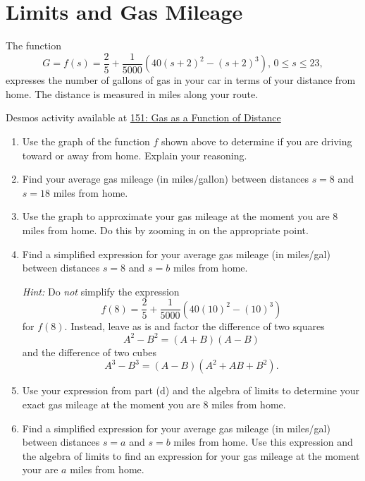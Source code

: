 \documentclass{ximera}
\begin{document}
\section{Limits and Gas Mileage}
\begin{example} \label{Ex:9sd8gfs}
The function 
\[
   G = f(s) = \frac{2}{5} +\frac{1}{5000}(40(s+2)^2 - (s+2)^3) , \, 0\leq s \leq 23 ,
\]
expresses the number of gallons of gas in your car in terms of your distance from home. The distance is measured in miles along your route. 

\begin{onlineOnly}
    \begin{center}
\end{center}
\end{onlineOnly}

Desmos activity available at
\href{https://www.desmos.com/calculator/xzkknfpkw3}{151: Gas as a Function of Distance}

\begin{enumerate}
\item Use the graph of the function $f$ shown above to determine if you are driving toward or away from home. Explain your reasoning.

\item Find your average gas mileage (in miles/gallon) between distances $s=8$ and $s=18$ miles from home.

\item Use the graph to approximate your gas mileage at the moment you are $8$ miles from home. Do this by zooming in on the appropriate point.

\item Find a simplified expression for your average gas mileage (in miles/gal) between distances $s=8$ and $s=b$ miles from home. 

\emph{Hint:} Do \emph{not} simplify the expression 
\[
     f(8) = \frac{2}{5} +\frac{1}{5000}(40(10)^2 - (10)^3)
\]
for $f(8)$. Instead, leave as is and factor the difference of two squares 
\[
     A^2 - B^2 = (A+B)(A-B)
\]
and the difference of two cubes
\[
       A^3 - B^3 = (A-B)(A^2 + AB + B^2).
\]

\item Use your expression from part (d) and the algebra of limits to determine your exact gas mileage at the moment you are $8$ miles from home.

\item Find a simplified expression for your average gas mileage (in miles/gal) between distances $s=a$ and $s=b$ miles from home.  Use this expression and the algebra of limits to find an expression for your gas mileage at the moment your are $a$ miles from home.

\end{enumerate}



\end{example}
\end{document}
